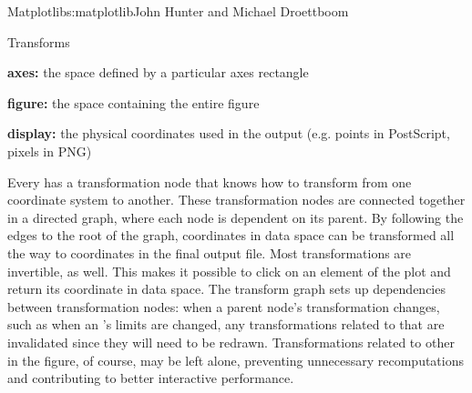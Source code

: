 \begin{aosachapter}{Matplotlib}{s:matplotlib}{John Hunter and Michael Droettboom}
\begin{aosasect1}{Transforms}
\begin{aosaitemize}
\item \textbf{axes:} the space defined by a particular axes rectangle

\item \textbf{figure:} the space containing the entire figure

\item \textbf{display:} the physical coordinates used in the output
  (e.g. points in PostScript, pixels in PNG)
\end{aosaitemize}

Every  has a transformation node that knows how to
transform from one coordinate system to another.  These transformation
nodes are connected together in a directed graph, where each node is
dependent on its parent.  By following the edges to the root of the
graph, coordinates in data space can be transformed all the way to
coordinates in the final output file.  Most transformations are
invertible, as well.  This makes it possible to click on an element of
the plot and return its coordinate in data space.  The transform graph
sets up dependencies between transformation nodes: when a parent
node's transformation changes, such as when an 's limits are
changed, any transformations related to that  are invalidated
since they will need to be redrawn.  Transformations related to other
 in the figure, of course, may be left alone, preventing
unnecessary recomputations and contributing to better interactive
performance.


\end{aosasect1}
\end{aosachapter}
